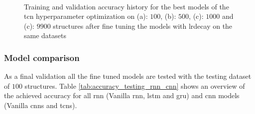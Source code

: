 \documentclass[conference]{IEEEtran}
\begin{document}
\begin{figure}[htp]
	\centering
	\quad
	\\
	\quad
	\caption{Training and validation accuracy history for the best models of the \gls{tcn} hyperparameter optimization on (a): $ 100 $, (b): $ 500 $, (c): $ 1000 $ and (c): $ 9900 $ structures after fine tuning the models with \gls{lrdecay} on the same datasets}
	\label{fig:accuracy_adaptiveLR_TCN}
\end{figure}

\subsubsection{Model comparison}


As a final validation all the fine tuned models are tested with the testing dataset of $ 100 $ structures. Table \ref{tab:accuracy_testing_rnn_cnn} shows an overview of the achieved accuracy for all \gls{rnn} (Vanilla \gls{rnn}, \gls{lstm} and \gls{gru}) and \gls{cnn} models (Vanilla \glspl{cnn} and \glspl{tcn}).
\end{document}
